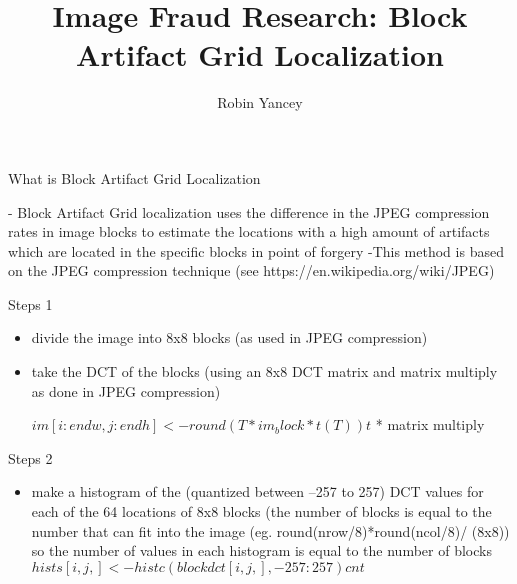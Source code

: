 \documentclass{beamer}
\title{Image Fraud Research: Block Artifact Grid Localization}
\author{Robin Yancey\\
}
\begin{document}
 

 \lstset{language=R}

\begin{frame}
\titlepage


\end{frame}


\begin{frame}{What is Block Artifact Grid Localization}

- Block Artifact Grid localization uses the difference in the JPEG compression rates in image blocks to estimate the locations with a high amount of artifacts which are located in the specific blocks in point of forgery 
\newline
-This method is based on the JPEG compression technique (see https://en.wikipedia.org/wiki/JPEG)

\end{frame}




\begin{frame}{Steps 1}



\begin{itemize}

 \item divide the image into 8x8 blocks (as used in JPEG compression)

\item take the DCT of the blocks (using an 8x8 DCT matrix and matrix multiply as done in JPEG compression) 



\textbf{\small{$  im[i:endw,j:endh] <- round(T * im_block * t(T))t  $}}
\newline
* matrix multiply


\end{itemize}

\end{frame}

\begin{frame}{Steps 2}
\begin{itemize}

\item make a histogram of the (quantized between --257 to 257) DCT values for each of the 64 locations of 8x8 blocks (the number of blocks is equal to the number that can fit into the image (eg. round(nrow/8)*round(ncol/8)/ (8x8)) so the number of values in each histogram is equal to the number of blocks
%
\newline
\newline
\textbf{\small{$  hists[i,j,] <- histc(blockdct[i,j,],-257:257)cnt  $}}
%
%

\end{itemize}
\end{frame}
\end{document}
